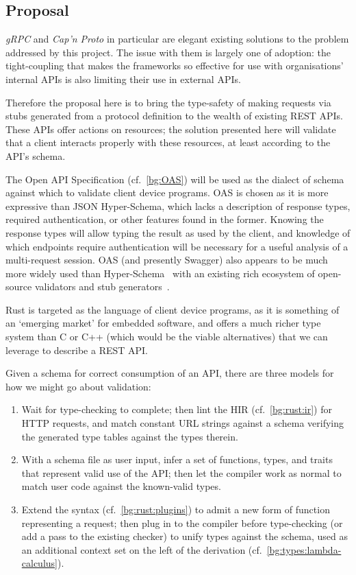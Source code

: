 \subsection{Proposal} \label{impl:proposal}

\emph{gRPC} and \emph{Cap'n Proto} in particular are elegant existing solutions to the problem addressed by this project. The issue with them is largely one of adoption: the tight-coupling that makes the frameworks so effective for use with organisations' internal APIs is also limiting their use in external APIs.

Therefore the proposal here is to bring the type-safety of making requests via stubs generated from a protocol definition to the wealth of existing REST APIs. These APIs offer actions on resources; the solution presented here will validate that a client interacts properly with these resources, at least according to the API's schema.

The Open API Specification (cf.~\cref{bg:OAS}) will be used as the dialect of schema against which to validate client device programs. OAS is chosen as it is more expressive than JSON Hyper-Schema, which lacks a description of response types, required authentication, or other features found in the former. Knowing the response types will allow typing the result as used by the client, and knowledge of which endpoints require authentication will be necessary for a useful analysis of a multi-request session. OAS (and presently Swagger) also appears to be much more widely used than Hyper-Schema~\cite{anyone_use_hyperschema} with an existing rich ecosystem of open-source validators and stub generators~\cite{swagger_oss}. \label{impl:proposal:schema}

Rust is targeted as the language of client device programs, as it is something of an `emerging market' for embedded software, and offers a much richer type system than C or C++ (which would be the viable alternatives) that we can leverage to describe a REST API. \label{impl:proposal:lang}

Given a schema for correct consumption of an API, there are three models for how we might go about validation:
\begin{enumerate}
	\item Wait for type-checking to complete; then lint the HIR (cf.~\cref{bg:rust:ir}) for HTTP requests, and match constant URL strings against a schema verifying the generated type tables against the types therein.
	\item With a schema file as user input, infer a set of functions, types, and traits that represent valid use of the API; then let the compiler work as normal to match user code against the known-valid types.
	\item Extend the syntax (cf.~\cref{bg:rust:plugins}) to admit a new form of function representing a request; then plug in to the compiler before type-checking (or add a pass to the existing checker) to unify types against the schema, used as an additional context set on the left of the derivation (cf.~\cref{bg:types:lambda-calculus}).
\end{enumerate} \label{impl:proposal:validation-models}

